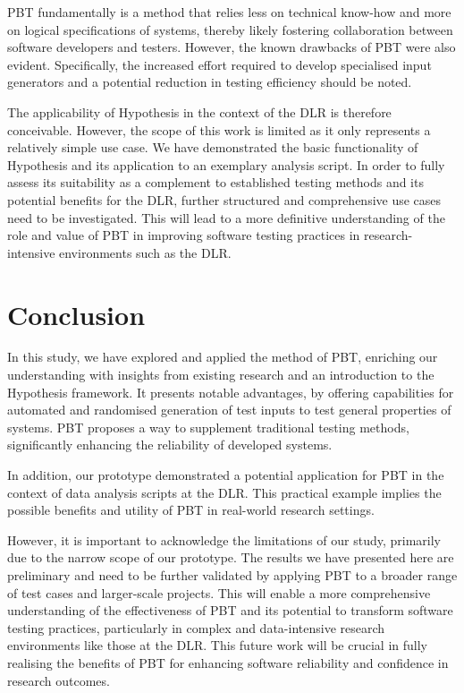 \documentclass[runningheads]{llncs}
\begin{document}
PBT fundamentally is a method that relies less on technical know-how and more on logical specifications of systems, thereby likely fostering collaboration between software developers and testers. However, the known drawbacks of PBT were also evident. Specifically, the increased effort required to develop specialised input generators and a potential reduction in testing efficiency should be noted.

The applicability of Hypothesis in the context of the DLR is therefore conceivable. However, the scope of this work is limited as it only represents a relatively simple use case. We have demonstrated the basic functionality of Hypothesis and its application to an exemplary analysis script. In order to fully assess its suitability as a complement to established testing methods and its potential benefits for the DLR, further structured and comprehensive use cases need to be investigated. This will lead to a more definitive understanding of the role and value of PBT in improving software testing practices in research-intensive environments such as the DLR.

\section{Conclusion}
In this study, we have explored and applied the method of PBT, enriching our understanding with insights from existing research and an introduction to the Hypothesis framework. It presents notable advantages, by offering capabilities for automated and randomised generation of test inputs to test general properties of systems. PBT proposes a way to supplement traditional testing methods, significantly enhancing the reliability of developed systems.

In addition, our prototype demonstrated a potential application for PBT in the context of data analysis scripts at the DLR. This practical example implies the possible benefits and utility of PBT in real-world research settings.

However, it is important to acknowledge the limitations of our study, primarily due to the narrow scope of our prototype. The results we have presented here are preliminary and need to be further validated by applying PBT to a broader range of test cases and larger-scale projects. This will enable a more comprehensive understanding of the effectiveness of PBT and its potential to transform software testing practices, particularly in complex and data-intensive research environments like those at the DLR. This future work will be crucial in fully realising the benefits of PBT for enhancing software reliability and confidence in research outcomes.

%
%
%
\newpage


\end{document}
